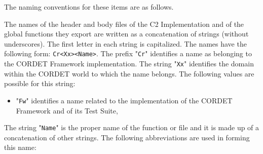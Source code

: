 \documentclass{pnp_article}
\begin{document}
The naming conventions for these items are as follows.
 
The names of the header and body files of the C2 Implementation and of the global 
functions they export are written as a concatenation of strings (without underscores). 
The first letter in each string is capitalized. The names have the following form: 
\texttt{Cr<Xx><Name>}. The prefix "\texttt{Cr}" identifies a name as belonging to the CORDET Framework implementation. 
The string "\texttt{Xx}" identifies the domain within the CORDET world 
to which the name belongs. The following values are possible for this string: 

\begin{itemize}
\item "\texttt{Fw}" identifies a name related to the implementation of the CORDET Framework and of its Test Suite, 
\end{itemize}

The string "\texttt{Name}" is the proper name of the function or file and it is made up of a concatenation of other strings. The following abbreviations are used in forming this name:
\end{document}
